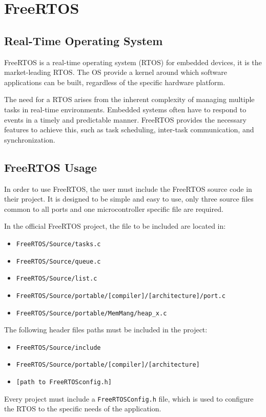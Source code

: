 \section{FreeRTOS}
\subsection{Real-Time Operating System}
FreeRTOS is a real-time operating system (RTOS) for embedded devices, it is the market-leading RTOS. The OS provide a kernel around which software applications can be built, regardless of the specific hardware platform.

The need for a RTOS arises from the inherent complexity of managing multiple tasks in real-time environments. Embedded systems often have to respond to events in a timely and predictable manner. FreeRTOS provides the necessary features to achieve this, such as task scheduling, inter-task communication, and synchronization.

\subsection{FreeRTOS Usage}
In order to use FreeRTOS, the user must include the FreeRTOS source code in their project. It is designed to be simple and easy to use, only three source files common to all ports and one microcontroller specific file are required.

In the official FreeRTOS project, the file to be included are located in:

\begin{itemize}
    \item \texttt{FreeRTOS/Source/tasks.c}
    \item \texttt{FreeRTOS/Source/queue.c}
    \item \texttt{FreeRTOS/Source/list.c}
    \item \texttt{FreeRTOS/Source/portable/[compiler]/[architecture]/port.c}
    \item \texttt{FreeRTOS/Source/portable/MemMang/heap\_x.c}
\end{itemize}

The following header files paths must be included in the project:

\begin{itemize}
    \item \texttt{FreeRTOS/Source/include}
    \item \texttt{FreeRTOS/Source/portable/[compiler]/[architecture]}
    \item \texttt{[path to FreeRTOSconfig.h]}
\end{itemize}

Every project must include a \texttt{FreeRTOSConfig.h} file, which is used to configure the RTOS to the specific needs of the application.